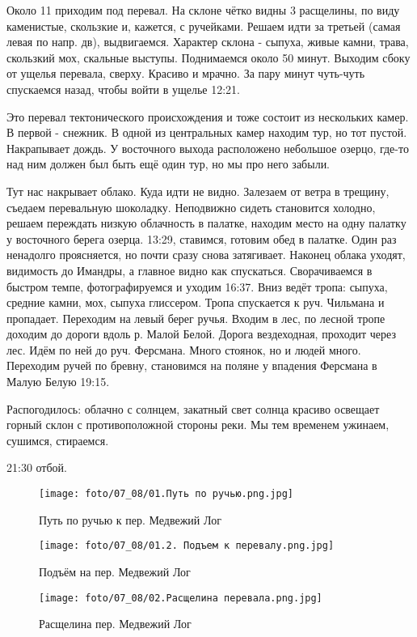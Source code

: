 Около 11 приходим под перевал. На склоне чётко видны 3 расщелины, по виду каменистые, скользкие и, кажется, с ручейками.
Решаем идти за третьей (самая левая по напр. дв), выдвигаемся. Характер склона - сыпуха, живые камни, трава,
скользкий мох, скальные выступы. Поднимаемся около 50 минут. Выходим сбоку от ущелья перевала, сверху.
Красиво и мрачно. За пару минут чуть-чуть спускаемся назад, чтобы войти в ущелье 12:21.

Это перевал тектонического происхождения и тоже состоит из нескольких камер. В первой - снежник.
В одной из центральных камер находим тур, но тот пустой. Накрапывает дождь. У восточного выхода расположено
небольшое озерцо, где-то над ним должен был быть ещё один тур, но мы про него забыли.

Тут нас накрывает облако. Куда идти не видно. Залезаем от ветра в трещину, съедаем перевальную шоколадку.
Неподвижно сидеть становится холодно, решаем переждать низкую облачность в палатке, находим место на одну палатку
у восточного берега озерца. 13:29, ставимся, готовим обед в палатке. Один раз ненадолго проясняется,
но почти сразу снова затягивает. Наконец облака уходят, видимость до Имандры, а главное видно как спускаться.
Сворачиваемся в быстром темпе, фотографируемся и уходим 16:37.
Вниз ведёт тропа: сыпуха, средние камни, мох, сыпуха глиссером. Тропа спускается к руч. Чильмана и пропадает.
Переходим на левый берег ручья. Входим в лес, по лесной тропе доходим до дороги вдоль р. Малой Белой.
Дорога вездеходная, проходит через лес. Идём по ней до руч. Ферсмана. Много стоянок, но и людей много.
Переходим ручей по бревну, становимся на поляне у впадения Ферсмана в Малую Белую 19:15.

Распогодилось: облачно с солнцем, закатный свет солнца красиво освещает горный склон с противоположной стороны реки.
Мы тем временем ужинаем, сушимся, стираемся.

21:30 отбой.

\begin{figure}
    \centering
    \texttt{[image: foto/07\_08/01.Путь по ручью.png.jpg]}
    \caption{Путь по ручью к пер. Медвежий Лог}
\end{figure}

\begin{figure}
    \centering
    \texttt{[image: foto/07\_08/01.2. Подъем к перевалу.png.jpg]}
    \caption{Подъём на пер. Медвежий Лог}
\end{figure}

\begin{figure}
    \centering
    \texttt{[image: foto/07\_08/02.Расщелина перевала.png.jpg]}
    \caption{Расщелина пер. Медвежий Лог}
\end{figure}

